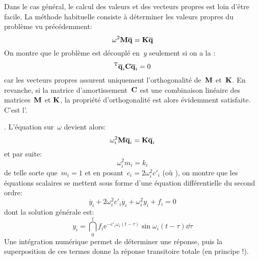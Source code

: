 Dans le cas général, le calcul des valeurs et des vecteurs propres  est loin d'être facile. La méthode habituelle consiste à déterminer les valeurs propres  du problème vu précédemment:
\begin{equation} \omega^2\MM{M}\VV{\overline{q}}=\MM{K}\VV{\overline{q}} \end{equation}
On montre que le problème est découplé en~$y$ seulement si on a la : \begin{equation}\LL{\overline{q}}_i\MM{C}\VV{\overline{q}}_i=0\end{equation}
\medskipvm
{} car les vecteurs propres assurent uniquement l'orthogonalité de~$\MM{M}$ et~$\MM{K}$.
En revanche, si la matrice d'amortissement~$\MM{C}$ est une combinaison linéaire des matrices~$\MM{M}$ et $\MM{K}$, la propriété d'orthogonalité est alors évidemment satisfaite. C'est l'.

.
L'équation sur~$\omega$ devient alors:
\begin{equation} \omega_i^2\MM{M}\VV{\overline{q}}_i =\MM{K}\VV{\overline{q}}_i \end{equation}
et par suite:
\begin{equation} \omega_i^2m_i = k_i\end{equation}
\medskipvm
{} de telle sorte que~$m_i=1$ et en posant~$c_i = 2\omega_i^2c'_i$ (où ), on montre que les équations scalaires se mettent sous forme d'une équation différentielle du second ordre:
\begin{equation} \ddot{y_i}+2\omega_i^2c'_i \dot{y_i} + \omega_i^2y_i + f_i = 0 \end{equation}
dont la solution générale est:
\begin{equation} y_i = \dint_0^t f_i \mathrm{e}^{-c'_i\omega_i(t-\tau)}\sin \omega_i (t-\tau) \dd\tau \end{equation}
\medskipvm
Une intégration numérique permet de déterminer une réponse, puis la superposition de ces termes donne la réponse transitoire totale (en principe !).
\medskipvm
{}

